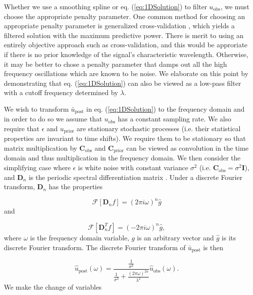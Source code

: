 \documentclass[10pt,a4paper]{article}
\begin{document}
Whether we use a smoothing spline or eq. (\ref{eq:1DSolution}) to filter $u_\mathrm{obs}$, we must choose the appropriate penalty parameter.  One common method for choosing an appropriate penalty parameter is generalized cross-validation \citep{Craven1979}, which yields a filtered solution with the maximum predictive power.  There is merit to using an entirely objective approach such as cross-validation, and this would be approriate if there is no prior knowledge of the signal's characteristic wavelength.  Otherwise, it may be better to chose a penalty parameter that damps out all the high frequency oscillations which are known to be noise.  We elaborate on this point by demonstrating that eq. (\ref{eq:1DSolution}) can also be viewed as a low-pass filter with a cutoff frequency determined by $\lambda$.  

We wish to transform $\bar{u}_\mathrm{post}$ in eq. (\ref{eq:1DSolution}) to the frequency domain and in order to do so we assume that $u_\mathrm{obs}$ has a constant sampling rate. We also require that $\epsilon$ and $u_\mathrm{prior}$ are stationary stochastic processes (i.e. their statistical properties are invariant to time shifts).  We require them to be stationary so that matrix multiplication by $\mathbf{C}_\mathrm{obs}$ and $\mathbf{C}_\mathrm{prior}$ can be viewed as convolution in the time domain and thus multiplication in the frequency domain.  We then consider the simplifying case where $\epsilon$ is white noise with constant variance $\sigma^2$ (i.e. $\mathbf{C}_\mathrm{obs} = \sigma^2\mathbf{I}$), and $\mathbf{D}_n$ is the periodic spectral differentiation matrix \citep[e.g.][]{Trefethen2000}.  Under a discrete Fourier transform, $\mathbf{D}_n$ has the properties

\begin{equation}\label{eq:Property1}
  \mathcal{F}[\mathbf{D}_nf] = (2\pi i\omega)^n \hat{g}
\end{equation}
and

\begin{equation}\label{eq:Property2}
  \mathcal{F}[\mathbf{D}^T_nf] = (-2\pi i\omega)^n \hat{g},
\end{equation}
where $\omega$ is the frequency domain variable, $g$ is an arbitrary vector and $\hat{g}$ is its discrete Fourier transform.  The discrete Fourier transform of $\bar{u}_\mathrm{post}$ is then

\begin{equation}\label{eq:1DFourierSoln1}
\hat{u}_\mathrm{post}(\omega) = \frac{\frac{1}{\sigma^2}}
                                  {\frac{1}{\sigma^2} +                  
                                  \frac{(2\pi\omega)^{2n}}{\lambda^2}}
                                  \hat{u}_\mathrm{obs}(\omega).
\end{equation}
We make the change of variables 
\end{document}
